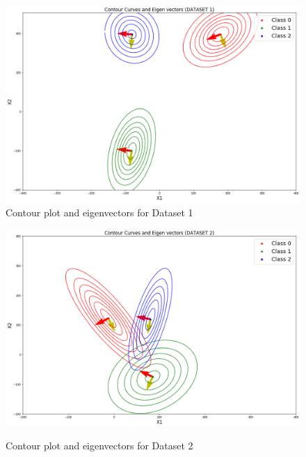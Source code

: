 \documentclass[a4 paper]{article}
\begin{document}
\newpage
{} 
\begin{figure}[!htb]
    \centering
    \begin{minipage}{0.50\textwidth}
        \centering
        \includegraphics[width=1\textwidth]{eig1.png} \\
        \caption{Contour plot and eigenvectors for Dataset 1}
    \end{minipage}\hfill
    \begin{minipage}{0.50\textwidth}
        \centering
        \includegraphics[width=1\textwidth]{eig2.png}\\
        \caption{Contour plot and eigenvectors for Dataset 2}
    \end{minipage}
    \label{fig:l}
\end{figure}

\end{document}
